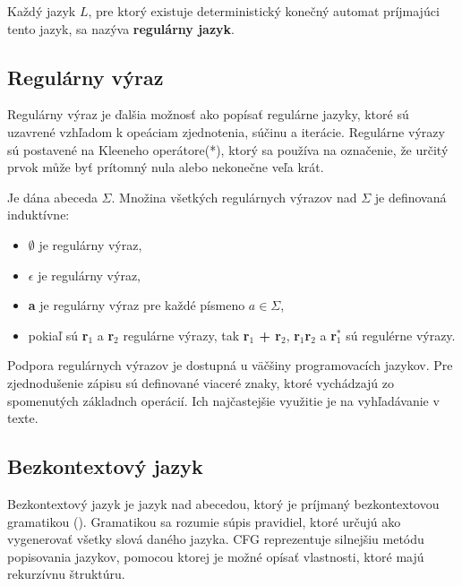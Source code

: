 Každý jazyk $L$, pre ktorý existuje deterministický konečný automat príjmajúci tento jazyk, sa nazýva \textbf{regulárny jazyk}.

\subsection{Regulárny výraz}\label{regexp}
Regulárny výraz je ďalšia možnosť ako popísať regulárne jazyky, ktoré sú uzavrené vzhľadom k opeáciam zjednotenia, súčinu a iterácie. Regulárne výrazy sú postavené na Kleeneho operátore(*), ktorý sa používa na označenie, že určitý prvok může byť prítomný nula alebo nekonečne veľa krát.
\begin{definice}
Je dána abeceda $\Sigma$. Množina všetkých regulárnych výrazov nad $\Sigma$ je definovaná induktívne:
\begin{itemize}
\item $\emptyset$ je regulárny výraz,
\item $\epsilon$ je regulárny výraz,
\item \textbf{a} je regulárny výraz pre každé písmeno $a \in \Sigma$,
\item pokiaľ sú \textbf{r$_1$} a \textbf{r$_2$} regulárne výrazy, tak \textbf{r$_1$ + r$_2$}, \textbf{r$_1$r$_2$} a \textbf{r$_1^*$} sú regulérne výrazy. \cite{demlova:automaty}
\end{itemize}
\end{definice}

Podpora regulárnych výrazov je dostupná u väčšiny programovacích jazykov. Pre zjednodušenie zápisu sú definované viaceré znaky, ktoré vychádzajú zo spomenutých základnch operácií. Ich najčastejšie využitie je na vyhľadávanie v texte.


\subsection{Bezkontextový jazyk}\label{CFG}
Bezkontextový jazyk je jazyk nad abecedou, ktorý je príjmaný bezkontextovou gramatikou (). Gramatikou sa rozumie súpis pravidiel, ktoré určujú ako vygenerovať všetky slová daného jazyka. CFG reprezentuje silnejšiu metódu popisovania jazykov, pomocou ktorej je možné opísať vlastnosti, ktoré majú rekurzívnu štruktúru.

